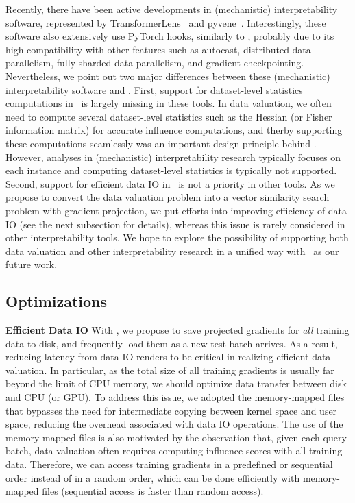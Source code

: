 Recently, there have been active developments in (mechanistic) interpretability software, represented by TransformerLens~\cite{nanda2022transformerlens} and pyvene~\cite{wu2024pyvene}. Interestingly, these software also extensively use PyTorch hooks, similarly to \software, probably due to its high compatibility with other features such as autocast, distributed data parallelism, fully-sharded data parallelism, and gradient checkpointing. Nevertheless, we point out two major differences between these (mechanistic) interpretability software and \software. First, support for dataset-level statistics computations in \software\ is largely missing in these tools. In data valuation, we often need to compute several dataset-level statistics such as the Hessian (or Fisher information matrix) for accurate influence computations, and therby supporting these computations seamlessly was an important design principle behind \software. However, analyses in (mechanistic) interpretability research typically focuses on each instance and computing dataset-level statistics is typically not supported. Second, support for efficient data IO in \software\ is not a priority in other tools. As we propose to convert the data valuation problem into a vector similarity search problem with gradient projection, we put efforts into improving efficiency of data IO (see the next subsection for details), whereas this issue is rarely considered in other interpretability tools. We hope to explore the possibility of supporting both data valuation and other interpretability research in a unified way with \software\ as our future work.

\subsection{Optimizations}
\textbf{Efficient Data IO\hspace{2.5mm}} With \method, we propose to save projected gradients for \textit{all} training data to disk, and frequently load them as a new test batch arrives. As a result, reducing latency from data IO renders to be critical in realizing efficient data valuation. In particular, as the total size of all training gradients is usually far beyond the limit of CPU memory, we should optimize data transfer between disk and CPU (or GPU). To address this issue, we adopted the memory-mapped files that bypasses the need for intermediate copying between kernel space and user space, reducing the overhead associated with data IO operations. The use of the memory-mapped files is also motivated by the observation that, given each query batch, data valuation often requires computing influence scores with all training data. Therefore, we can access training gradients in a predefined or sequential order instead of in a random order, which can be done efficiently with memory-mapped files (sequential access is faster than random access). 

